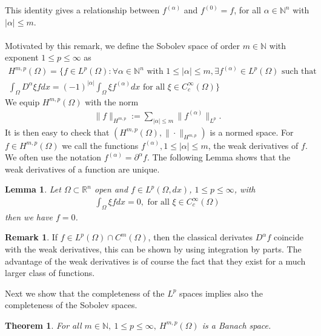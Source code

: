 \documentclass[11pt,a4paper]{article}
\newtheorem{lem}{Lemma}[section]
\newtheorem{thm}{Theorem}[section]
\theoremstyle{definition}
\newtheorem{rem}{Remark}[section]
\begin{document}
This identity gives a relationship between $f^{( \alpha)}$ and $f^{(0)}=f$, for all $\alpha \in \mathbb{N}^n$ with $| \alpha | \leq m$. \\
\\
Motivated by this remark, we define the Sobolev space of order $m \in \mathbb{N}$ with exponent $1 \leq p \leq \infty$ as 
\begin{align*}
H^{m,p}( \Omega) = \lbrace f \in L^p( \Omega) : \forall \alpha \in \mathbb{N}^n \text{ with } 1 \leq | \alpha | \leq m, \exists f^{( \alpha)} \in L^p( \Omega) \text{ such that } \\ \int_\Omega D^\alpha \xi f dx = (-1)^{| \alpha|} \int_\Omega \xi f^{( \alpha)} dx \text{ for all } \xi \in C_c^\infty ( \Omega) \rbrace
\end{align*}
We equip $H^{m,p}( \Omega)$ with the norm
\begin{align*}
\|f\|_{H^{m,p}} := \sum_{| \alpha| \leq m } \|f^{( \alpha)} \|_{L^p}.
\end{align*}
It is then easy to check that $(H^{m,p}( \Omega), \| \cdot \|_{H^{m,p}})$ is a normed space. For $f \in H^{m,p}( \Omega)$ we call the functions $f^{( \alpha)}, 1 \leq | \alpha | \leq m$, the weak derivatives of $f$. We often use the notation $f^{( \alpha)} = \partial^\alpha f$. The following Lemma shows that the weak derivatives of a function are unique.
\begin{lem} Let $\Omega \subset \mathbb{R}^n$ open and $f \in L^p( \Omega, dx)$, $1 \leq p \leq \infty$, with 
\begin{align*}
\int_\Omega \xi f dx =0, \text{ for all } \xi \in C_c^\infty( \Omega)
\end{align*}
then we have $f=0$. 
\end{lem}
\begin{rem} If $f \in L^p( \Omega) \cap C^m( \Omega)$, then the classical derivates $D^\alpha f$ coincide with the weak derivatives, this can be shown by using integration by parts. The advantage of the weak derivatives is of course the fact that they exist for a much larger class of functions.
\end{rem}
\noindent Next we show that the completeness of the $L^p$ spaces implies also the completeness of the Sobolev spaces. 
\begin{thm} For all $m \in \mathbb{N}, \ 1 \leq p \leq \infty, \ H^{m,p}( \Omega)$ is a Banach space. 
\end{thm} 
\end{document}
